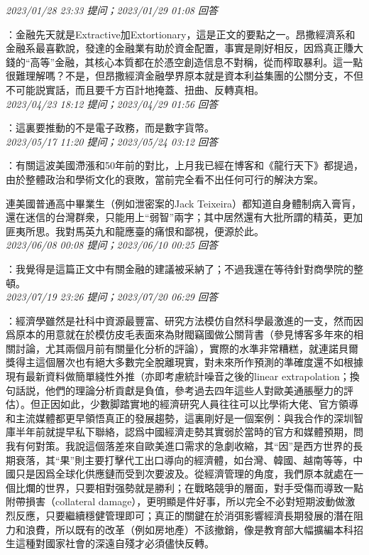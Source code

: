 \documentclass[twocolumn]{ctexart}
\begin{document}
\textit{\hfill\noindent\small 2023/01/28 23:33 提问；2023/01/29 01:08 回答}

：金融先天就是Extractive加Extortionary，這是正文的要點之一。昂撒經濟系和金融系最喜歡說，發達的金融業有助於資金配置，事實是剛好相反，因爲真正賺大錢的“高等”金融，其核心本質都在於憑空創造信息不對稱，從而榨取暴利。這一點很難理解嗎？不是，但昂撒經濟金融學界原本就是資本利益集團的公關分支，不但不可能説實話，而且要千方百計地掩蓋、扭曲、反轉真相。
\\

\textit{\hfill\noindent\small 2023/04/23 18:12 提问；2023/04/29 01:56 回答}

：這裏要推動的不是電子政務，而是數字貨幣。
\\

\textit{\hfill\noindent\small 2023/05/17 11:20 提问；2023/05/24 03:12 回答}

：有關這波美國滯漲和50年前的對比，上月我已經在博客和《龍行天下》都提過，由於整體政治和學術文化的衰敗，當前完全看不出任何可行的解決方案。

連美國普通高中畢業生（例如泄密案的Jack Teixeira）都知道自身體制病入膏肓，還在迷信的台灣群衆，只能用上“弱智”兩字；其中居然還有大批所謂的精英，更加匪夷所思。我對馬英九和龍應臺的痛恨和鄙視，便源於此。
\\

\textit{\hfill\noindent\small 2023/06/08 00:08 提问；2023/06/10 00:25 回答}

：我覺得是這篇正文中有關金融的建議被采納了；不過我還在等待針對商學院的整頓。
\\

\textit{\hfill\noindent\small 2023/07/19 23:26 提问；2023/07/20 06:29 回答}

：經濟學雖然是社科中資源最豐富、研究方法模仿自然科學最激進的一支，然而因爲原本的用意就在於模仿皮毛表面來為財閥竊國做公關背書（參見博客多年來的相關討論，尤其兩個月前有關量化分析的評論），實際的水準非常糟糕，就連諾貝爾獎得主這個層次也有絕大多數完全脫離現實，對未來所作預測的準確度還不如根據現有最新資料做簡單綫性外推（亦即考慮統計噪音之後的linear extrapolation；換句話説，他們的理論分析貢獻是負值，參考過去四年這些人對歐美通脹壓力的評估）。但正因如此，少數脚踏實地的經濟研究人員往往可以比學術大佬、官方領導和主流媒體都更早領悟真正的發展趨勢，這裏剛好是一個案例：與我合作的深圳智庫半年前就提早私下聯絡，認爲中國經濟走勢其實弱於當時的官方和媒體預期，問我有何對策。我說這個落差來自歐美進口需求的急劇收縮，其“因”是西方世界的長期衰落，其“果”則主要打擊代工出口導向的經濟體，如台灣、韓國、越南等等，中國只是因爲全球化供應鏈而受到次要波及。從經濟管理的角度，我們原本就處在一個比爛的世界，只要相對强勢就是勝利；在戰略競爭的層面，對手受傷而導致一點附帶損害（collateral damage），更明顯是件好事，所以完全不必對短期波動做激烈反應，只要繼續穩健管理即可；真正的關鍵在於消弭影響經濟長期發展的潛在阻力和浪費，所以既有的改革（例如房地產）不該撤銷，像是教育部大幅擴編本科招生這種對國家社會的深遠自殘才必須儘快反轉。
\end{document}
